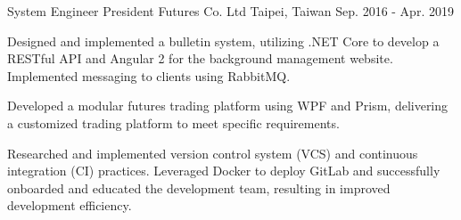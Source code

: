 \begin{cventries}
\cventry
{System Engineer} %
{President Futures Co. Ltd} %
{Taipei, Taiwan} %
{Sep. 2016 - Apr. 2019} %
{
  \begin{cvitems} %
    \item {Designed and implemented a bulletin system, utilizing .NET Core to develop a RESTful API and Angular 2 for the background management website. Implemented messaging to clients using RabbitMQ.}
    \item {Developed a modular futures trading platform using WPF and Prism, delivering a customized trading platform to meet specific requirements.}
    \item {Researched and implemented version control system (VCS) and continuous integration (CI) practices. Leveraged Docker to deploy GitLab and successfully onboarded and educated the development team, resulting in improved development efficiency.}
  \end{cvitems}
}

\end{cventries}
